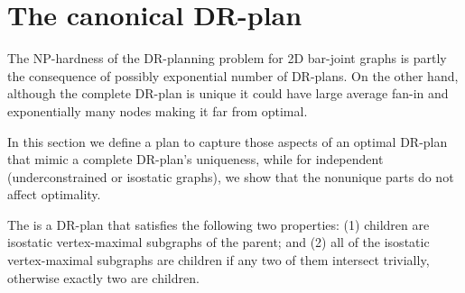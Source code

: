 \section{The canonical DR-plan}
\label{sec:DRP}


The NP-hardness of the DR-planning problem for 2D bar-joint graphs is partly
the consequence of possibly exponential number of DR-plans. On
the other hand, although the complete DR-plan is unique
it could have large average fan-in and exponentially many nodes making it
far from optimal.

In this section we define a  plan to capture those aspects of an optimal
DR-plan that mimic a complete DR-plan's uniqueness, while for independent
(underconstrained or isostatic graphs), we show that the nonunique parts do not affect
optimality.

\begin{definition}
    The  is a DR-plan that satisfies the following two properties:
    (1) children are isostatic vertex-maximal subgraphs of the parent; and
    (2) all of the isostatic vertex-maximal subgraphs are children if any two of them intersect trivially, otherwise exactly two are children.
\end{definition}



